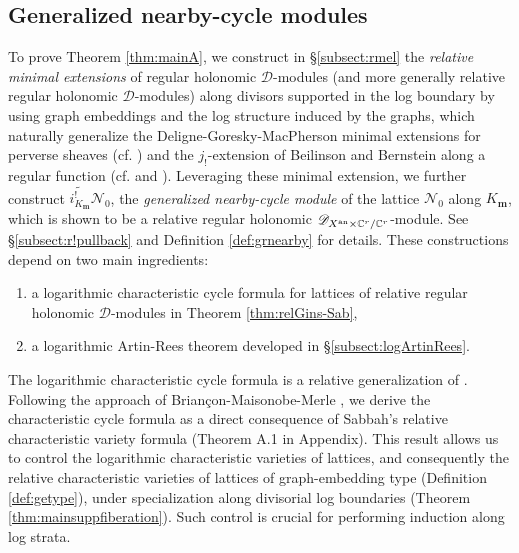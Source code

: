 \documentclass{amsart}
\theoremstyle{plain}
\numberwithin{theorem}{section}
\theoremstyle{definition}
\theoremstyle{remark}
\theoremstyle{definition}
\newcommand{\wt}{\widetilde}
\newcommand{\C}{\mathbb{C}} %
\newcommand{\cN}{\mathcal{N}}
\newcommand{\bm}{\mathbf{m}}
\newcommand{\shD}{\mathscr{D}}
\newcommand{\an}{\textup{an}}
\begin{document}
\subsection{Generalized nearby-cycle modules}To prove Theorem \ref{thm:mainA}, we construct in \S\ref{subsect:rmel} the \emph{relative minimal extensions} of regular holonomic $\shD$-modules (and more generally relative regular holonomic $\shD$-modules) along divisors supported in the log boundary by using graph embeddings and the log structure induced by the graphs, which naturally generalize the  
Deligne-Goresky-MacPherson minimal extensions for perverse sheaves (cf. \cite[\S8.2.1]{HTT}) and the $j_!$-extension of Beilinson and Bernstein along a regular function (cf. \cite[\S4.1]{BBJats} and \cite[\S3.8]{Gil}). Leveraging these minimal extension, we further construct $\wt{i^!_{K_\bm}}\cN_0$, the \emph{generalized nearby-cycle module} of the lattice $\cN_0$ along $K_\bm$, which is shown to be a relative regular holonomic $\shD_{X^\an\times \C^r/\C^r}$-module. See \S\ref{subsect:r!pullback} and Definition \ref{def:grnearby} for details. These constructions depend on two main ingredients:
\begin{enumerate}
    \item a logarithmic characteristic cycle formula for lattices of relative regular holonomic $\shD$-modules in Theorem \ref{thm:relGins-Sab},
    \item a logarithmic Artin-Rees theorem developed in \S\ref{subsect:logArtinRees}. 
\end{enumerate}

The logarithmic characteristic cycle formula is a relative generalization of \cite[Thm.A1.2]{Gil1}. Following the approach of Brian\c{c}on-Maisonobe-Merle \cite{BMM}, we derive the characteristic cycle formula as a direct consequence of Sabbah's relative characteristic variety formula (Theorem A.1 in Appendix). This result allows us to control the logarithmic characteristic varieties of lattices, and consequently the relative characteristic varieties of lattices of graph-embedding type (Definition \ref{def:getype}), under specialization along divisorial log boundaries (Theorem \ref{thm:mainsuppfiberation}). Such control is crucial for performing induction along log strata.

\end{document}
